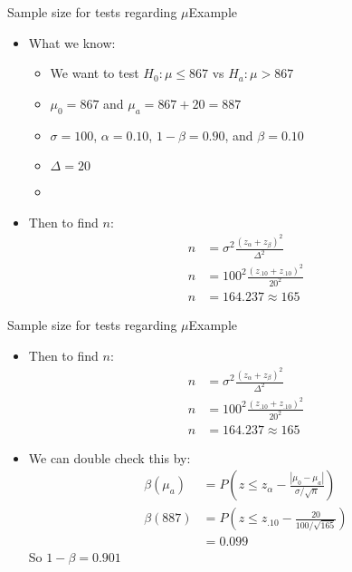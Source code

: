 \documentclass[xcolor=dvipsnames]{beamer}
\begin{document}
\begin{frame}{Sample size for tests regarding $\mu$}{Example}
	\begin{itemize}
		\item What we know:
		\begin{itemize}
			\item We want to test $H_0: \mu \leq 867$ vs $H_a: \mu > 867$
			\item $\mu_0 = 867$ and $\mu_a = 867+20=887$
			\item $\sigma = 100$, $\alpha = 0.10$, $1-\beta = 0.90$, and $\beta = 0.10$
			\item $\Delta = 20$
			\item[]
		\end{itemize}
		\item Then to find $n$: \pause
		\begin{align*}
			n &= \sigma^2\frac{(z_{\alpha} + z_{\beta})^2}{\Delta^2} \\
			n &= 100^2\frac{(z_{.10} + z_{.10})^2}{20^2} \\
			n &= 164.237 \approx 165
		\end{align*}
	\end{itemize}
\end{frame}

\begin{frame}{Sample size for tests regarding $\mu$}{Example}
	\begin{itemize}
		\item Then to find $n$:
		\begin{align*}
		n &= \sigma^2\frac{(z_{\alpha} + z_{\beta})^2}{\Delta^2} \\
		n &= 100^2\frac{(z_{.10} + z_{.10})^2}{20^2} \\
		n &= 164.237 \approx 165
		\end{align*} \pause
		\item We can double check this by:
		\begin{align*}
			\beta(\mu_a) &= P\left(z \leq z_{\alpha} - \frac{|\mu_0 - \mu_a|}{\sigma / \sqrt{n}} \right) \\
			\beta(887) &= P\left(z \leq z_{.10} - \frac{20}{100 / \sqrt{165}} \right) \\
			&= 0.099
		\end{align*}
		So $1-\beta = 0.901$
	\end{itemize}
\end{frame}
\end{document}
